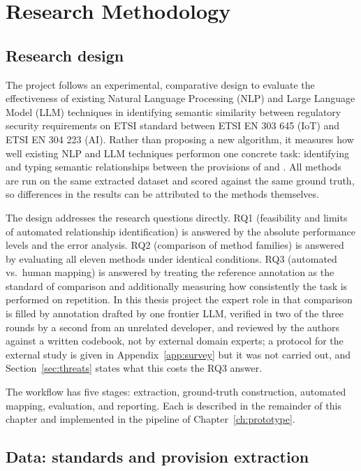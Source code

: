 \chapter{Research Methodology}\label{ch:methodology}

\section{Research design}\label{sec:design}

The project follows an experimental, comparative design to evaluate the effectiveness
of existing Natural Language Processing (NLP) and Large Language Model (LLM) techniques
in identifying semantic similarity between regulatory security requirements
on ETSI standard between ETSI EN 303 645 (IoT) and ETSI EN 304 223 (AI).
Rather than proposing a new algorithm, it measures how well existing NLP and 
LLM techniques performon one concrete task: identifying and typing semantic relationships between
the provisions of \standardA{} and \standardB{}. All methods are run on the
same extracted dataset and scored against the same ground truth, so
differences in the results can be attributed to the methods themselves.

The design addresses the research questions directly. RQ1 (feasibility and
limits of automated relationship identification) is answered by the absolute
performance levels and the error analysis. RQ2 (comparison of method families)
is answered by evaluating all eleven methods under identical conditions. RQ3
(automated vs.\ human mapping) is answered by treating the reference annotation
as the standard of comparison and additionally measuring how consistently the
task is performed on repetition. In this thesis project the expert role in that 
comparison is filled by annotation drafted by one frontier LLM, verified in two 
of the three rounds by a second from an unrelated developer, and reviewed by the authors
against a written codebook, not by external domain experts; a protocol for the external study is given in
Appendix~\ref{app:survey} but it was not carried out, and Section~\ref{sec:threats}
states what this costs the RQ3 answer.

The workflow has five stages: extraction, ground-truth construction,
automated mapping, evaluation, and reporting. Each is described in the remainder
of this chapter and implemented in the pipeline of Chapter~\ref{ch:prototype}.

\section{Data: standards and provision extraction}\label{sec:data}

